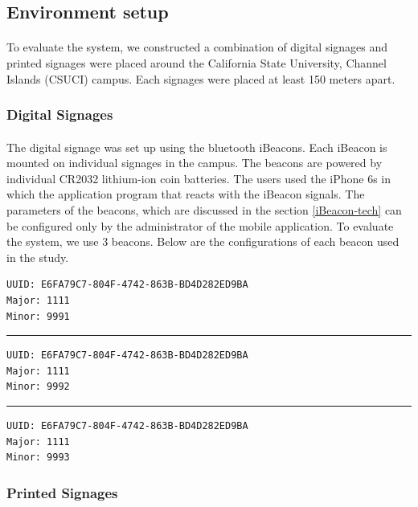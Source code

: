 \documentclass[12pt]{article}
\begin{document}
\subsection{Environment setup}
\label{env}
\paragraph{}To evaluate the system, we constructed a combination of digital signages and printed signages were placed around the California State University, Channel Islands (CSUCI) campus. Each signages were placed at least 150 meters apart.

\subsubsection{Digital Signages}
\paragraph{}The digital signage was set up using the bluetooth iBeacons. Each iBeacon is mounted on individual signages in the campus. The beacons are powered by individual CR2032 lithium-ion coin batteries. The users used the iPhone 6s in which the application program that reacts with the iBeacon signals. The parameters of the beacons, which are discussed in the section \ref{iBeacon-tech} can be configured only by the administrator of the mobile application. To evaluate the system, we use 3 beacons. Below are the configurations of each beacon used in the study.

\begin{lstlisting}
UUID: E6FA79C7-804F-4742-863B-BD4D282ED9BA
Major: 1111
Minor: 9991
\end{lstlisting}

\noindent\rule{13cm}{0.4pt}

\begin{lstlisting}
UUID: E6FA79C7-804F-4742-863B-BD4D282ED9BA
Major: 1111
Minor: 9992
\end{lstlisting}

\noindent\rule{13cm}{0.4pt}

\begin{lstlisting}
UUID: E6FA79C7-804F-4742-863B-BD4D282ED9BA
Major: 1111
Minor: 9993
\end{lstlisting}

\subsubsection{Printed Signages}
\label{printed-signages}
\end{document}
